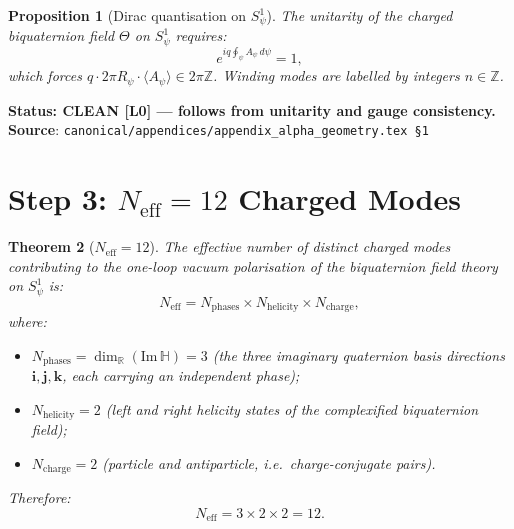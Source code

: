 \documentclass[12pt,a4paper]{article}
\newtheorem{theorem}{Theorem}[section]
\newtheorem{proposition}[theorem]{Proposition}
\theoremstyle{definition}
\theoremstyle{remark}
\begin{document}
\begin{proposition}[Dirac quantisation on $S^1_\psi$]
\label{prop:bc:Dirac}
The unitarity of the charged biquaternion field $\Theta$ on $S^1_\psi$ requires:
\begin{equation}
  e^{iq\oint_\psi A_\psi\,d\psi} = 1,
  \label{eq:bc:dirac}
\end{equation}
which forces $q\cdot 2\pi R_\psi \cdot \langle A_\psi \rangle \in 2\pi\mathbb{Z}$.
Winding modes are labelled by integers $n\in\mathbb{Z}$.
\end{proposition}

\begin{resultbox}
\textbf{Status: CLEAN [L0] — follows from unitarity and gauge consistency.}\\
\textbf{Source}: \texttt{canonical/appendices/appendix\_alpha\_geometry.tex \S1}
\end{resultbox}

\section{Step 3: $N_{\mathrm{eff}} = 12$ Charged Modes}
\label{sec:bc:neff}

\begin{theorem}[$N_{\mathrm{eff}} = 12$]
\label{thm:bc:Neff}
The effective number of distinct charged modes contributing to the one-loop
vacuum polarisation of the biquaternion field theory on $S^1_\psi$ is:
\begin{equation}
  N_{\mathrm{eff}} = N_{\mathrm{phases}} \times N_{\mathrm{helicity}} \times N_{\mathrm{charge}},
  \label{eq:bc:Neff_product}
\end{equation}
where:
\begin{itemize}
  \item $N_{\mathrm{phases}} = \dim_{\mathbb{R}}(\mathrm{Im}\,\mathbb{H}) = 3$
        (the three imaginary quaternion basis directions $\mathbf{i},\mathbf{j},\mathbf{k}$,
        each carrying an independent phase);
  \item $N_{\mathrm{helicity}} = 2$ (left and right helicity states of the
        complexified biquaternion field);
  \item $N_{\mathrm{charge}} = 2$ (particle and antiparticle, i.e.\ charge-conjugate pairs).
\end{itemize}
Therefore:
\begin{equation}
  N_{\mathrm{eff}} = 3 \times 2 \times 2 = 12.
  \label{eq:bc:Neff_12}
\end{equation}
\end{theorem}
\end{document}
